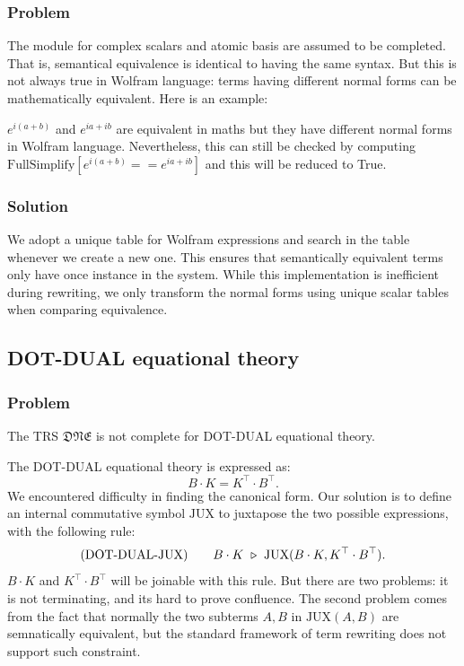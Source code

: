\subsubsection*{Problem}

The module for complex scalars and atomic basis are assumed to be completed. That is, semantical equivalence is identical to having the same syntax. But this is not always true in Wolfram language: terms having different normal forms can be mathematically equivalent. Here is an example:

$ e^{i(a+b)} $ and $ e^{ia + ib} $ are equivalent in maths but they have different normal forms in Wolfram language. Nevertheless, this can still be checked by computing $\text{FullSimplify}[e^{i(a+b)} == e^{ia + ib}]$ and this will be reduced to True.

\subsubsection*{Solution}

We adopt a unique table for Wolfram expressions and search in the table whenever we create a new one. This ensures that semantically equivalent terms only have once instance in the system. While this implementation is inefficient during rewriting, we only transform the normal forms using unique scalar tables when comparing equivalence.

\subsection{\textsf{DOT-DUAL} equational theory}

\subsubsection*{Problem}
The TRS $\mathfrak{DNE}$ is not complete for \textsf{DOT-DUAL} equational theory.

The \textsf{DOT-DUAL} equational theory is expressed as:
$$
B \cdot K = K^\top \cdot B^\top.
$$
We encountered difficulty in finding the canonical form. Our solution is to define an internal commutative symbol $\textrm{JUX}$ to juxtapose the two possible expressions, with the following rule:
$$
\textrm{(DOT-DUAL-JUX)} \qquad B \cdot K \ \triangleright\  \textrm{JUX}(B \cdot K, K^\top \cdot B^\top).
$$
$B\cdot K$ and $K^\top \cdot B^\top$ will be joinable with this rule. But there are two problems: it is not terminating, and its hard to prove confluence. The second problem comes from the fact that normally the two subterms $A, B$ in $\textrm{JUX}(A, B)$ are semnatically equivalent, but the standard framework of term rewriting does not support such constraint. 

